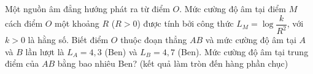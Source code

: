\begin{ex}%
	Một nguồn âm đẳng hướng phát ra từ điểm $O$. Mức cường độ âm tại điểm $M$ cách điểm $O$ một khoảng $R$ ($R>0$) được tính bởi công thức $L_M=\log \dfrac{k}{R^2}$, với $k>0$ là hằng số. Biết điểm $O$ thuộc đoạn thẳng $AB$ và mức cường độ âm tại $A$ và $B$ lần lượt là $L_{A}=4{,}3$ (Ben) và $L_{B}=4{,}7$ (Ben). Mức cường độ âm tại trung điểm của $AB$ bằng bao nhiêu Ben? (kết quả làm tròn đến hàng phần chục)
\end{ex} 

